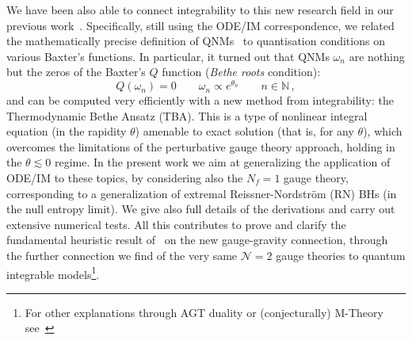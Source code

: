 \documentclass[11pt,a4paper]{elsarticle}
\newcommand{\be}{\begin{equation}}
\newcommand{\ee}{\end{equation}}
\numberwithin{figure}{section}
\numberwithin{table}{section}
\begin{document}
We have been also able to connect integrability to this new research field in our previous work~\cite{FioravantiGregori:2021}. Specifically, still using the ODE/IM correspondence, we related the mathematically precise definition of QNMs~\cite{Nollert:1999} to quantisation conditions on various Baxter's functions. In particular, it turned out that QNMs $\omega_n$ are nothing but the zeros of the Baxter's $Q$ function (\textit{Bethe roots} condition):
\be 
Q(\omega_n) = 0 \qquad \omega_n \propto e^{\theta_n} \qquad n \in \mathbb{N}\,,
\ee 
and can be computed very efficiently with a new method from integrability: the Thermodynamic Bethe Ansatz (TBA). This is a type of nonlinear integral equation (in the rapidity $\theta$) amenable to exact solution (that is, for any $\theta$), which overcomes the limitations of the perturbative gauge theory approach, holding in the $\theta\lesssim 0$ regime. In the present work we aim at generalizing the application of ODE/IM to these topics, by considering also the $N_f=1$ gauge theory, corresponding to a generalization of extremal Reissner-Nordstr\"om (RN) BHs (in the null entropy limit). We give also full details of the derivations and carry out extensive numerical tests. All this contributes to prove and clarify the fundamental heuristic result of~\cite{AminovGrassiHatsuda:2020} on the new gauge-gravity connection, through the further connection we find of the very same $\mathcal N=2$ gauge theories to quantum integrable models\footnote{For other explanations through AGT duality or (conjecturally) M-Theory see~\cite{BonelliIossaLichtigTanzini:2021,BianchiConsoliGrilloMorales:2021b}}. %
\end{document}
